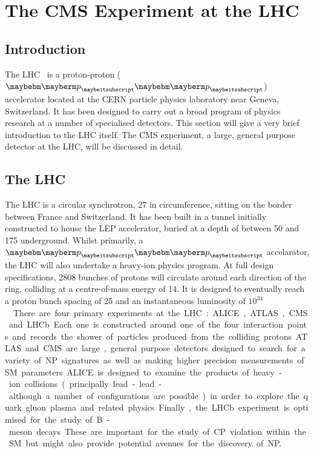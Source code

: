 \chapter{The \acl{CMS} Experiment at the \acl{LHC}}
\label{sec:experiment}
\section{Introduction}
The \acf{LHC}~\cite{lhc_design_report} is a proton-proton ($\Pp\Pp$) accelerator
located at the CERN particle physics laboratory near Geneva, Switzerland. It has
been designed to carry out a broad program of physics research at a number of
specialised detectors. This section will give a very brief introduction to the
\ac{LHC} itself. The \acf{CMS} experiment, a large, general purpose detector at
the \ac{LHC}, will be discussed in detail.

\section{The \acl{LHC}}
The \ac{LHC} is a circular synchrotron, \unit{27}{\kilo\metre} in circumference,
sitting on the border between France and Switzerland. It has been built in a
tunnel initially constructed to house the \ac{LEP} accelerator, buried at a
depth of between 50 and \unit{175}{\metre} underground. Whilst primarily, a
$\Pp\Pp$ accelarator, the \ac{LHC} will also undertake a heavy-ion physics
program. At full design specifications, 2808 bunches of protons will circulate
around each direction of the ring, colliding at a centre-of-mass energy of
\unit{14}{\TeV}. It is designed to eventually reach a proton bunch spacing of
\unit{25}{\ns} and an instantaneous luminosity of
\unit{$10^{34}$}{\rpsquare{\centi\metre}\usk\reciprocal\second}.

There are four primary experiments at the LHC: \ac{ALICE}, \ac{ATLAS}, \ac{CMS}
and \ac{LHCb}. Each one is constructed around one of the four interaction points
and records the shower of particles produced from the colliding protons. ATLAS
and CMS are large, general purpose detectors designed to search for a variety of
\ac{NP} signatures as well as making higher precision measurements of \ac{SM}
parameters. \ac{ALICE} is designed to examine the products of heavy-ion
collisions (principally lead-lead - although a number of configurations are
possible) in order to explore the quark gluon plasma and related
physics. Finally, the \ac{LHCb} experiment is optimised for the study of B-meson
decays. These are important for the study of CP violation within the \ac{SM} but
might also provide potential avenues for the discovery of \ac{NP}.

